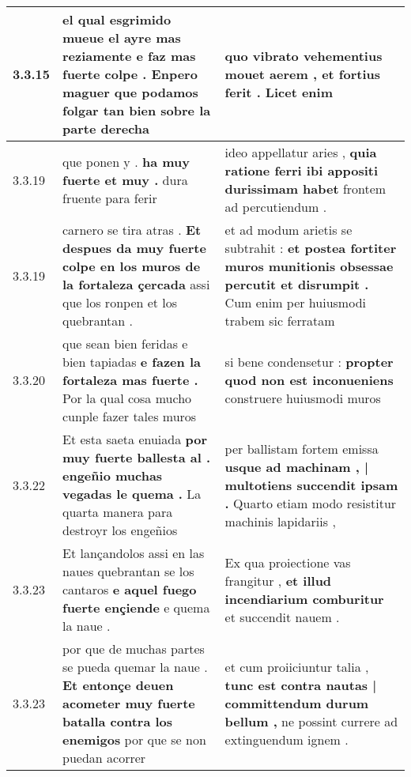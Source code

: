 \begin{tabular}{|p{1cm}|p{6.5cm}|p{6.5cm}|}
3.3.15 & el qual esgrimido mueue el ayre mas reziamente \textbf{ e faz mas fuerte colpe . } Enpero maguer que podamos folgar tan bien sobre la parte derecha & quo vibrato vehementius mouet aerem , \textbf{ et fortius ferit . } Licet enim \\\hline
3.3.19 & que ponen y . \textbf{ ha muy fuerte et muy . } dura fruente para ferir & ideo appellatur aries , \textbf{ quia ratione ferri ibi appositi durissimam habet } frontem ad percutiendum . \\\hline
3.3.19 & carnero se tira atras . \textbf{ Et despues da muy fuerte colpe en los muros de la fortaleza çercada } assi que los ronpen et los quebrantan . & et ad modum arietis se subtrahit : \textbf{ et postea fortiter muros munitionis obsessae percutit et disrumpit . } Cum enim per huiusmodi trabem sic ferratam \\\hline
3.3.20 & que sean bien feridas e bien tapiadas \textbf{ e fazen la fortaleza mas fuerte . } Por la qual cosa mucho cunple fazer tales muros & si bene condensetur : \textbf{ propter quod non est inconueniens } construere huiusmodi muros \\\hline
3.3.22 & Et esta saeta enuiada \textbf{ por muy fuerte ballesta al . engeñio muchas vegadas le quema . } La quarta manera para destroyr los engeñios & per ballistam fortem emissa \textbf{ usque ad machinam , | multotiens succendit ipsam . } Quarto etiam modo resistitur machinis lapidariis , \\\hline
3.3.23 & Et lançandolos assi en las naues quebrantan se los cantaros \textbf{ e aquel fuego fuerte ençiende } e quema la naue . & Ex qua proiectione vas frangitur , \textbf{ et illud incendiarium comburitur } et succendit nauem . \\\hline
3.3.23 & por que de muchas partes se pueda quemar la naue . \textbf{ Et entonçe deuen acometer muy fuerte batalla contra los enemigos } por que se non puedan acorrer & et cum proiiciuntur talia , \textbf{ tunc est contra nautas | committendum durum bellum , } ne possint currere ad extinguendum ignem . \\\hline

\end{tabular}
